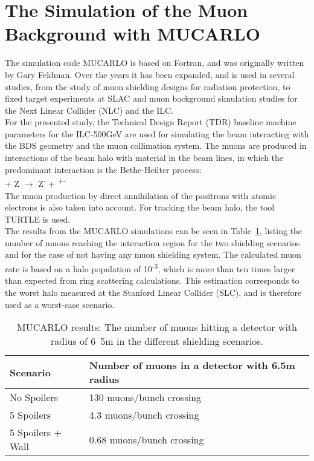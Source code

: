 \section{The Simulation of the Muon Background with MUCARLO}
\label{MUCARLO}

The simulation code MUCARLO is based on Fortran, and was originally written by Gary Feldman.
Over the years it has been expanded, and is used in several studies, from the study of muon shielding designs for radiation protection, to fixed target experiments at SLAC and muon background simulation studies for the Next Linear Collider (NLC) and the ILC.\cite{MuonBkg_05TeV, MuonBkg_1TeV}\\
For the presented study, the Technical Design Report (TDR) baseline machine parameters for the ILC-500GeV are used for simulating the beam interacting with the BDS geometry and the muon collimation system.
The muons are produced in interactions of the beam halo with material in the beam lines, in which the predominant interaction is the Bethe-Heilter process:\\
\textgamma + Z $\rightarrow$ Z' + \murm\textsuperscript{+}\murm\textsuperscript{-}\\
The muon production by direct annihilation of the positrons with atomic electrons is also taken into account.\cite[sec. 2]{Mucarlo}
For tracking the beam halo, the tool TURTLE\cite{Turtle} is used.\\
The results from the MUCARLO simulations can be seen in Table~\ref{tab:MuonRates}, listing the number of muons reaching the interaction region for the two shielding scenarios and for the case of not having any muon shielding system.
The calculated muon rate is based on a halo population of 10\textsuperscript{-3}, which is more than ten times larger than expected from ring scattering calculations.
This estimation corresponds to the worst halo measured at the Stanford Linear Collider (SLC), and is therefore used as a worst-case scenario.

\begin{table}
\caption{MUCARLO results: The number of muons hitting a detector with radius of \unit{6.5}{m} in the different shielding scenarios.}
\label{tab:MuonRates}
\centering
\begin{tabularx}{\textwidth}{ll}
\hline\hline
\textbf{Scenario} & \textbf{Number of muons in a detector with 6.5m radius}\\
\hline
\cline{1-2}
\hline
 No Spoilers & 130 muons/bunch crossing\\
 5 Spoilers& 4.3 muons/bunch crossing\\
 5 Spoilers + Wall & 0.68 muons/bunch crossing\\
\hline\hline
\end{tabularx}
\end{table}